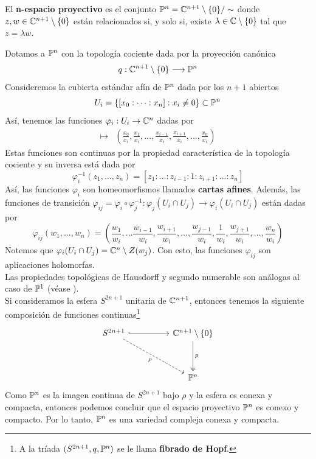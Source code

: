 \begin{example}
	El \textbf{n-espacio proyectivo} es el conjunto $\mathbb{P}^n=\mathbb{C}^{n+1}\setminus\{0\}/\sim$ donde $z,w\in\mathbb{C}^{n+1}\setminus\{0\}$ están relacionados si, y solo si, existe $\lambda\in\mathbb{C}\setminus\{0\}$ tal que  $z=\lambda w$.
	
	Dotamos a $\mathbb{P}^n$ con la topología cociente dada por la proyección canónica
	\begin{equation*}
		q:\mathbb{C}^{n+1}\setminus \{0\} \longrightarrow \mathbb{P}^n
	\end{equation*}
	Consideremos la cubierta estándar afín de $\mathbb{P}^n$ dada por los $n+1$ abiertos
	\begin{equation*}
		U_i=\{[x_0:\cdots:x_n]:x_i\neq 0\}\subset \mathbb{P}^n
	\end{equation*}
	Así, tenemos las funciones $\varphi_i:U_i\to\mathbb{C}^n$ dadas por
	\begin{align*}
		[x_0:x_1:\dots:x_n]\mapsto & \left( \frac{x_0}{x_i},\frac{x_1}{x_i},\dots, \frac{x_{i-1}}{x_i},\frac{x_{i+1}}{x_i},\dots,\frac{x_n}{x_i}\right)
	\end{align*} 
	Estas funciones son continuas por la propiedad característica de la topología cociente y su inversa está dada por
	\begin{equation*}
		\varphi_{i}^{-1}(z_1,\dots,z_n)=[z_1:\dots:z_{i-1}:1:z_{i+1}:\dots:z_n]
	\end{equation*}
	Así, las funciones $\varphi_i$ son homeomorfismos llamados \textbf{cartas afines}.
	Además, las funciones de transición $\varphi_{ij}=\varphi_i\circ\varphi_j^{-1}:\varphi_j(U_i\cap U_j)\to\varphi_i(U_i\cap U_j)$ están dadas por
	\begin{equation*}
		\varphi_{ij}(w_1,\dots,w_n)=\left(\frac{w_1}{w_i},\dots \frac{w_{i-1}}{w_i},\frac{w_{i+1}}{w_i},\dots,\frac{w_{j-1}}{w_i},\frac{1}{w_i},\frac{w_{j+1}}{w_i},\dots,\frac{w_n}{w_i} \right)
	\end{equation*}
	Notemos que $\varphi_i(U_i \cap U_j)=\mathbb{C}^n\setminus Z(w_j)$. Con esto, las funciones $\varphi_{ij}$ son aplicaciones holomorfas.\\
	Las propiedades topológicas de Hausdorff y segundo numerable son análogas al caso de $\mathbb{P}^1$ (véase \parencite[Cap. 1, Sec. 1, Ejem. 1.3]{zaldrimann}).\\
	Si consideramos la esfera $S^{2n+1}$ unitaria de $\mathbb{C}^{n+1}$, entonces tenemos la siguiente composición de funciones continuas\footnote{A la tríada $(S^{2n+1},q,\mathbb{P}^n)$ se le llama \textbf{fibrado de Hopf}.}
	\[\begin{tikzcd}
		{S^{2n+1}} && {\cc^{n+1}\setminus\{0\}} \\
		\\
		&& {\mathbb{P}^n}
		\arrow[hook, from=1-1, to=1-3]
		\arrow["\rho"', dashed, from=1-1, to=3-3]
		\arrow["p", two heads, from=1-3, to=3-3]
	\end{tikzcd}\]
	Como $\mathbb{P}^n$ es la imagen continua de $S^{2n+1}$ bajo $\rho$ y la esfera es conexa y compacta, entonces podemos concluir que el espacio proyectivo $\mathbb{P}^n$ es conexo y compacto.
	Por lo tanto, $\mathbb{P}^n$ es una variedad compleja conexa y compacta.
\end{example}
